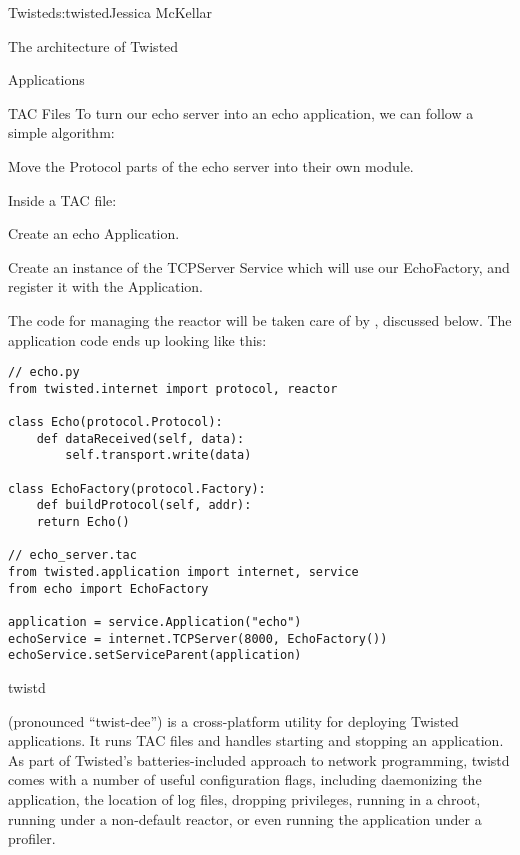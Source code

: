 \begin{aosachapter}{Twisted}{s:twisted}{Jessica McKellar}
\begin{aosasect1}{The architecture of Twisted}
\begin{aosasect2}{Applications}
\begin{aosasect3}{TAC Files}
To turn our echo server into an echo application, we can follow a simple
algorithm:

\begin{aosaenumerate}

\item Move the Protocol parts of the echo server into their own
  module.

\item Inside a TAC file:
    \begin{aosaenumerate}
    
\item Create an echo Application.

    
\item Create an instance of the TCPServer Service which will use our
  EchoFactory, and register it with the Application.
    
\end{aosaenumerate}

\end{aosaenumerate}

The code for managing the reactor will be taken care of by
, discussed below. The application code ends up looking like
this:

\begin{verbatim}
// echo.py
from twisted.internet import protocol, reactor

class Echo(protocol.Protocol):
    def dataReceived(self, data):
        self.transport.write(data)

class EchoFactory(protocol.Factory):
    def buildProtocol(self, addr):
    return Echo()

// echo_server.tac
from twisted.application import internet, service
from echo import EchoFactory

application = service.Application("echo")
echoService = internet.TCPServer(8000, EchoFactory())
echoService.setServiceParent(application)
\end{verbatim}

\end{aosasect3}

\begin{aosasect3}{twistd}

 (pronounced ``twist-dee'') is a cross-platform utility for
deploying Twisted applications. It runs TAC files and handles starting and
stopping an application. As part of Twisted's batteries-included approach to
network programming, twistd comes with a number of useful configuration flags,
including daemonizing the application, the location of log files, dropping
privileges, running in a chroot, running under a non-default reactor, or even
running the application under a profiler.


\end{aosasect3}
\end{aosasect2}
\end{aosasect1}
\end{aosachapter}
